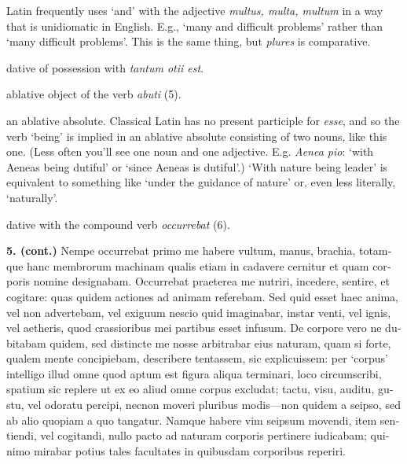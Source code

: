  Latin frequently uses `and' with the adjective \textit{multus, multa, multum} in a way that is unidiomatic in English. E.g., `many and difficult problems' rather than `many difficult problems'. This is the same thing, but \textit{plures} is comparative.

 dative of possession with \textit{tantum otii est}.

 ablative object of the verb \textit{abuti} (5).

 an ablative absolute. Classical Latin has no present participle for \textit{esse}, and so the verb `being' is implied in an ablative absolute consisting of two nouns, like this one. (Less often you'll see one noun and one adjective. E.g. \textit{Aenea pio}: `with Aeneas being dutiful' or `since Aeneas is dutiful'.) `With nature being leader' is equivalent to something like `under the guidance of nature' or, even less literally, `naturally'.

 dative with the compound verb \textit{occurrebat} (6).

\clearpage

\beginnumbering
\pstart
{}
\begin{latin}
    \textenglish{\textbf{5. (cont.)}} Nempe occurrebat primo me habere vultum, manus, brachia, totamque hanc membrorum machinam qualis etiam in cadavere cernitur et quam corporis nomine designabam. Occurrebat praeterea me nutriri, incedere, sentire, et cogitare: quas quidem actiones ad animam referebam. Sed quid esset haec anima, vel non advertebam, vel exiguum nescio quid imaginabar, instar venti, vel ignis, vel aetheris, quod crassioribus mei partibus esset infusum. De corpore vero ne dubitabam quidem, sed distincte me nosse arbitrabar eius naturam, quam si forte, qualem mente concipiebam, describere tentassem, sic explicuissem: per `corpus' intelligo illud omne quod aptum est figura aliqua terminari, loco circumscribi, spatium sic replere ut ex eo aliud omne corpus excludat; tactu, visu, auditu, gustu, vel odoratu percipi, necnon moveri pluribus modis---non quidem a seipso, sed ab alio quopiam a quo tangatur. Namque habere vim seipsum movendi, item sentiendi, vel cogitandi, nullo pacto ad naturam corporis pertinere iudicabam; quinimo mirabar potius tales facultates in quibusdam corporibus reperiri.
\end{latin}
\pend
\endnumbering

